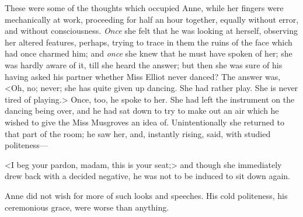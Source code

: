 These were some of the thoughts which occupied Anne, while her fingers were mechanically at work, proceeding for half an hour together, equally without error, and without consciousness. \textit{Once} she felt that he was looking at herself, observing her altered features, perhaps, trying to trace in them the ruins of the face which had once charmed him; and \textit{once} she knew that he must have spoken of her; she was hardly aware of it, till she heard the answer; but then she was sure of his having asked his partner whether Miss Elliot never danced? The answer was, <Oh, no; never; she has quite given up dancing. She had rather play. She is never tired of playing.> Once, too, he spoke to her. She had left the instrument on the dancing being over, and he had sat down to try to make out an air which he wished to give the Miss Musgroves an idea of. Unintentionally she returned to that part of the room; he saw her, and, instantly rising, said, with studied politeness—

<I beg your pardon, madam, this is your seat;> and though she immediately drew back with a decided negative, he was not to be induced to sit down again.

Anne did not wish for more of such looks and speeches. His cold politeness, his ceremonious grace, were worse than anything.